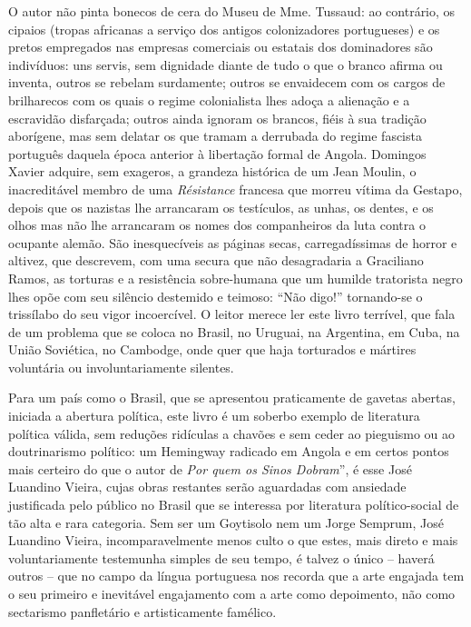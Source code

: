 \documentclass[
  letterpaper,
  DIV=11,
  numbers=noendperiod]{scrreprt}
\begin{document}
O autor não pinta bonecos de cera do Museu de Mme. Tussaud: ao
contrário, os cipaios (tropas africanas a serviço dos antigos
colonizadores portugueses) e os pretos empregados nas empresas
comerciais ou estatais dos dominadores são indivíduos: uns servis, sem
dignidade diante de tudo o que o branco afirma ou inventa, outros se
rebelam surdamente; outros se envaidecem com os cargos de brilharecos
com os quais o regime colonialista lhes adoça a alienação e a escravidão
disfarçada; outros ainda ignoram os brancos, fiéis à sua tradição
aborígene, mas sem delatar os que tramam a derrubada do regime fascista
português daquela época anterior à libertação formal de Angola. Domingos
Xavier adquire, sem exageros, a grandeza histórica de um Jean Moulin, o
inacreditável membro de uma \emph{Résistance} francesa que morreu vítima
da Gestapo, depois que os nazistas lhe arrancaram os testículos, as
unhas, os dentes, e os olhos mas não lhe arrancaram os nomes dos
companheiros da luta contra o ocupante alemão. São inesquecíveis as
páginas secas, carregadíssimas de horror e altivez, que descrevem, com
uma secura que não desagradaria a Graciliano Ramos, as torturas e a
resistência sobre-humana que um humilde tratorista negro lhes opõe com
seu silêncio destemido e teimoso: ``Não digo!'' tornando-se o trissílabo
do seu vigor incoercível. O leitor merece ler este livro terrível, que
fala de um problema que se coloca no Brasil, no Uruguai, na Argentina,
em Cuba, na União Soviética, no Cambodge, onde quer que haja torturados
e mártires voluntária ou involuntariamente silentes.

Para um país como o Brasil, que se apresentou praticamente de gavetas
abertas, iniciada a abertura política, este livro é um soberbo exemplo
de literatura política válida, sem reduções ridículas a chavões e sem
ceder ao pieguismo ou ao doutrinarismo político: um Hemingway radicado
em Angola e em certos pontos mais certeiro do que o autor de \emph{Por
quem os Sinos Dobram}'', é esse José Luandino Vieira, cujas obras
restantes serão aguardadas com ansiedade justificada pelo público no
Brasil que se interessa por literatura político-social de tão alta e
rara categoria. Sem ser um Goytisolo nem um Jorge Semprum, José Luandino
Vieira, incomparavelmente menos culto o que estes, mais direto e mais
voluntariamente testemunha simples de seu tempo, é talvez o único --
haverá outros -- que no campo da língua portuguesa nos recorda que a
arte engajada tem o seu primeiro e inevitável engajamento com a arte
como depoimento, não como sectarismo panfletário e artisticamente
famélico.
\end{document}
